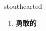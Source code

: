 
\begin{frame}
{\huge stouthearted}
\begin{center}
\begin{enumerate}\Large
  \item \textbf{勇敢的}
\end{enumerate}
\end{center}
\end{frame}
